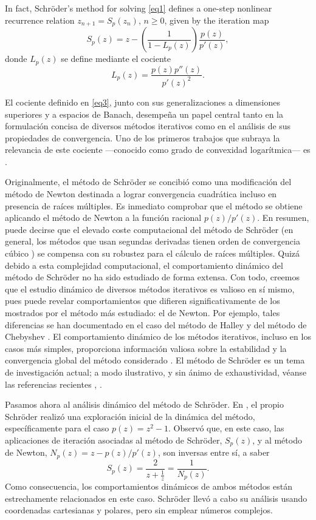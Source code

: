 \IfFileExists{aims.cls}{\documentclass{aims}}{\documentclass[11pt]{article}}
\numberwithin{equation}{section}
\theoremstyle{thmstyleone}%
\theoremstyle{thmstyletwo}%
\theoremstyle{thmstylethree}%
\begin{document}
In fact, Schr\"oder's method for solving \eqref{eq1} defines a one-step nonlinear recurrence relation
$z_{n+1}=S_p(z_n)$, $n\ge 0$, given by the iteration map
\begin{equation}\label{eq2}
S_p(z)=z -\left( \frac{1}{1-  L_p(z)}\right) \frac{p(z)}{p'(z)}, 
\end{equation}
donde $L_p(z)$ se define mediante el cociente
\begin{equation}\label{eq3}
L_p(z)= \frac{p(z)p''(z)}{p'(z)^2}.
\end{equation}

El cociente definido en \eqref{eq3}, junto con sus generalizaciones a dimensiones superiores y a espacios de Banach, desempeña un papel central tanto en la formulación concisa de diversos métodos iterativos como en el análisis de sus propiedades de convergencia. Uno de los primeros trabajos que subraya la relevancia de este cociente —conocido como grado de convexidad logarítmica— es \cite{2Her}.

Originalmente, el método de Schröder se concibió como una modificación del método de Newton destinada a lograr convergencia cuadrática incluso en presencia de raíces múltiples. Es inmediato comprobar que el método se obtiene aplicando el método de Newton a la función racional $p(z)/p'(z)$. En resumen, puede decirse que el elevado coste computacional del método de Schr\"oder (en general, los métodos que usan segundas derivadas tienen orden de convergencia cúbico \cite{3Traub}) se compensa con su robustez para el cálculo de raíces múltiples. Quizá debido a esta complejidad computacional, el comportamiento dinámico del método de Schröder no ha sido estudiado de forma extensa. Con todo, creemos que el estudio dinámico de diversos métodos iterativos es valioso en sí mismo, pues puede revelar comportamientos que difieren significativamente de los mostrados por el método más estudiado: el de Newton. Por ejemplo, tales diferencias se han documentado en el caso del método de Halley \cite{4Roberts} y del método de Chebyshev \cite{5GV}. El comportamiento dinámico de los métodos iterativos, incluso en los casos más simples, proporciona información valiosa sobre la estabilidad y la convergencia global del método considerado \cite{6BCT}. El método de Schr\"oder es un tema de investigación actual; a modo ilustrativo, y sin ánimo de exhaustividad, véanse las referencias recientes \cite{6CVV2024}, \cite{6MI2025}.

Pasamos ahora al análisis dinámico del método de Schröder. En \cite{1Sch}, el propio Schröder realizó una exploración inicial de la dinámica del método, específicamente para el caso $p(z)=z^2-1$. Observó que, en este caso, las aplicaciones de iteración asociadas al método de Schr\"oder, $S_p(z)$, y al método de Newton, $N_p(z)=z-p(z)/p'(z)$, son inversas entre sí, a saber
$$
S_p(z)=\frac{2}{z+\frac{1}{z}}=\frac{1}{N_p(z)}.
$$
Como consecuencia, los comportamientos dinámicos de ambos métodos están estrechamente relacionados en este caso. Schröder llevó a cabo su análisis usando coordenadas cartesianas y polares, pero sin emplear números complejos.
\end{document}
